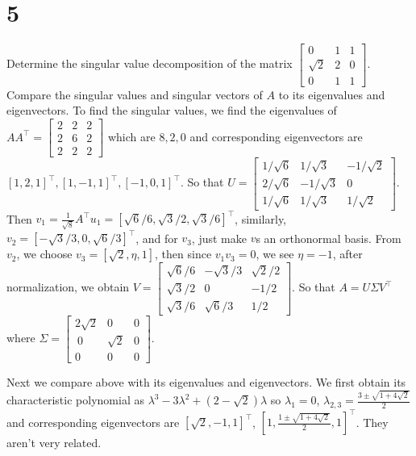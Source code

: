 \documentclass{article}
\begin{document}
\section*{5}
\begin{myleftlinebox}
    Determine the singular value decomposition of the matrix \(\begin{bmatrix}
        0 & 1 & 1\\
        \sqrt{2} & 2 & 0\\
        0 & 1 & 1
    \end{bmatrix}\). Compare the singular values and singular vectors of \(A\) to its eigenvalues and eigenvectors.
    \tcblower
    To find the singular values, we find the eigenvalues of \(AA^\top=\begin{bmatrix}
        2 & 2 & 2\\
        2 & 6 & 2\\
        2 & 2 & 2
    \end{bmatrix}\) which are \(8,2,0\) and corresponding eigenvectors are \([1,2,1]^\top,[1,-1,1]^\top,[-1,0,1]^\top\). So that \(U=\begin{bmatrix}
        1/\sqrt 6 & 1/\sqrt 3 & -1/\sqrt 2\\
        2/\sqrt 6 & -1/\sqrt 3 & 0\\
        1/\sqrt 6 & 1/\sqrt 3 & 1/\sqrt 2
    \end{bmatrix}\). Then \(v_1 = \frac{1}{\sqrt 8} A^\top u_1 = [\sqrt 6/6,\sqrt 3/2,\sqrt 3/6]^\top\), similarly, \(v_2 = [-\sqrt 3/3,0,\sqrt 6/3]^\top\), and for \(v_3\), just make \(v\)s an orthonormal basis. From \(v_2\),  we choose \(v_3 = [\sqrt 2,\eta, 1]\), then since \(v_1v_3=0\), we see \(\eta=-1\), after normalization, we obtain \(V = \begin{bmatrix}
        \sqrt6/6 & -\sqrt 3/3 & \sqrt 2/2\\
        \sqrt3/2 & 0 & -1/2\\
        \sqrt3/6 & \sqrt6/3 & 1/2
    \end{bmatrix}\). So that \(A = U\Sigma V^\top\) where \(\Sigma=\begin{bmatrix}
        2\sqrt 2 & 0 & 0\\\
        0 & \sqrt 2 & 0\\
        0 &0 & 0
    \end{bmatrix}\).
    
    Next we compare above with its eigenvalues and eigenvectors. We first obtain its characteristic polynomial as \(\lambda^3-3\lambda^2+(2-\sqrt 2)\lambda\) so \(\lambda_1=0\), \(\lambda_{2,3} = \frac{3\pm \sqrt{1+4\sqrt 2}}{2}\) and corresponding eigenvectors are \([\sqrt 2,-1,1]^\top\), \([1,\frac{1\pm \sqrt{1+4\sqrt 2}}{2},1]^\top\). They aren't very related.
\end{myleftlinebox}
\end{document}
